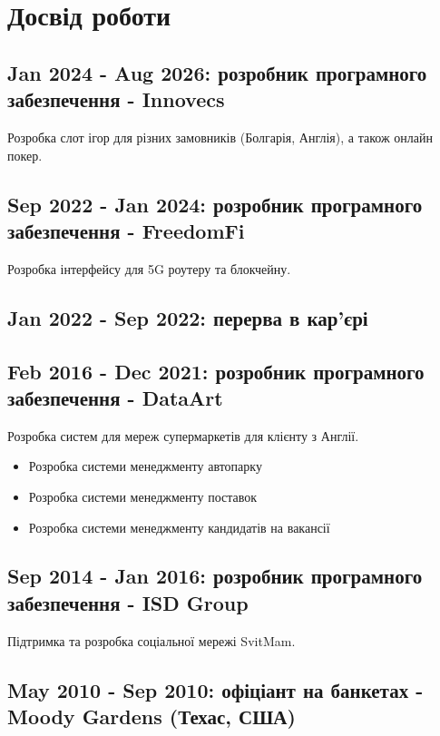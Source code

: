 \documentclass[a4paper, 14pt]{article}
\begin{document}
\section{Досвід роботи}
  \subsection{Jan 2024 - Aug 2026: розробник програмного забезпечення - Innovecs}
  Розробка слот ігор для різних замовників (Болгарія, Англія), а також онлайн покер.

  \subsection{Sep 2022 - Jan 2024: розробник програмного забезпечення - FreedomFi}

  Розробка інтерфейсу для 5G роутеру та блокчейну.

  \subsection{Jan 2022 - Sep 2022: перерва в кар'єрі}

  \subsection{Feb 2016 - Dec 2021: розробник програмного забезпечення - DataArt}  
  Розробка систем для мереж супермаркетів для клієнту з Англії.
  \begin{itemize}
    \item Розробка системи менеджменту автопарку \\
    \item Розробка системи менеджменту поставок \\
    \item Розробка системи менеджменту кандидатів на вакансії
  \end{itemize}

  \subsection{Sep 2014 - Jan 2016: розробник програмного забезпечення - ISD Group}
  Підтримка та розробка соціальної мережі SvitMam.

  \subsection{May 2010 - Sep 2010: офіціант на банкетах - Moody Gardens (Техас, США)}
\end{document}
